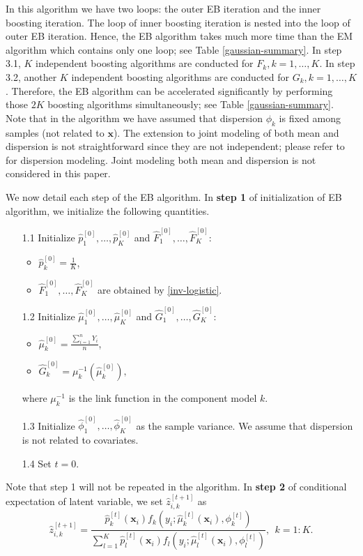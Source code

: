 \documentclass[11pt]{article}
\numberwithin{equation}{section}
\def\bx{\boldsymbol{x}}
\begin{document}
In this algorithm we have two loops: the outer EB iteration and the inner boosting iteration.
The loop of inner boosting iteration is nested into the loop of outer EB iteration.
Hence, the EB algorithm takes much more time than the EM algorithm which contains only one loop; see Table \ref{gaussian-summary}.
In step 3.1, $K$ independent boosting algorithms are conducted for $F_k, k=1,\ldots,K$.
In step 3.2,  another $K$ independent boosting algorithms are conducted for $G_k, k=1,\ldots,K$.
Therefore, the EB algorithm can be accelerated significantly by performing those $2K$ boosting algorithms simultaneously; see Table \ref{gaussian-summary}.  
Note that  in the algorithm we have assumed that dispersion $\phi_k$ is fixed among samples (not related to $\bx$). The extension to joint modeling of both mean and dispersion  is not straightforward since they are not independent; please refer to \citet{jorgensen:1997} for dispersion modeling.
Joint modeling both mean and dispersion is not considered in this paper.

We now detail each step of the EB algorithm.	
In {\bf step 1} of initialization of EB algorithm, we initialize the following quantities.
	\begin{enumerate}
		\item[1.1] Initialize $\hat{p}_1^{[0]}, \ldots,\hat{p}_K^{[0]}$ and   $\hat{F}_1^{[0]}, \ldots, \hat{F}_{K}^{[0]}$:
		
		\begin{itemize}
			\item 	$\hat{p}_k^{[0]}=\frac{1}{K}$,
			\item $\hat{F}_1^{[0]}, \ldots, \hat{F}_{K}^{[0]}$ are obtained by \eqref{inv-logistic}.
		\end{itemize}
		\item[1.2]
		Initialize $\hat{\mu}_1^{[0]},\ldots,\hat{\mu}_K^{[0]}$ and  $\hat{G}_1^{[0]},\ldots,\hat{G}_K^{[0]}$:
		\begin{itemize}
			\item $\hat{\mu}_k^{[0]}=\frac{\sum_{i=1}^nY_i}{n}$,
			\item $\hat{G}_k^{[0]}=\mu_k^{-1}(\hat{\mu}_k^{[0]}),$
		\end{itemize}
	where $\mu^{-1}_k$ is the link function in the component model $k$.
		\item[1.3] Initialize $\hat{\phi}_1^{[0]},\ldots, \hat{\phi}_K^{[0]}$ as the sample variance. We assume that dispersion is not related to covariates.
		\item[1.4] 	Set $t=0$.
	\end{enumerate}
Note that step 1 will not be repeated in the algorithm.	
In {\bf step 2} of conditional expectation of latent variable, we set  $\hat{z}_{i,k}^{[t+1]}$ as
	\begin{equation*}
		\hat{z}_{i,k}^{[t+1]}=\frac{\hat{p}_{k}^{[t]}(\bx_i) f_{k}\left(y_i ; \hat{\mu}_{k}^{[t]}(\bx_i), \phi_k^{[t]} \right)}{\sum_{l=1}^{K} \hat{p}_{l}^{[t]}(\bx_i) f_{l}\left(y_i ; \hat{\mu}_{l}^{[t]}(\bx_i), \phi_l^{[t]}\right)},~~ k=1:K.
	\end{equation*}
\end{document}
